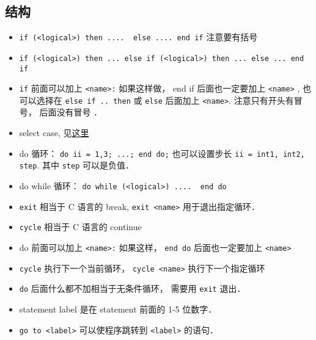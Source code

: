 \subsection{结构}
\begin{itemize}
\item \verb`if (<logical>) then ....  else .... end if` 注意要有括号
\item \verb`if (<logical>) then ... else if (<logical>) then ... else ... end if`
\item \verb`if` 前面可以加上 \verb`<name>:` 如果这样做，  end if 后面也一定要加上 \verb`<name>`  , 也可以选择在 \verb`else if .. then` 或 \verb`else` 后面加上 \verb`<name>`. 注意只有开头有冒号， 后面没有冒号 ．
\item select case, 见\href{http://www.tutorialspoint.com/fortran/select_case_construct.htm}{这里}
\item do 循环：   \verb`do ii = 1,3; ...; end do;` 也可以设置步长 \verb`ii = int1, int2, step`. 其中 \verb`step` 可以是负值．
\item do while 循环： \verb`do while (<logical>) ....  end do`
\item \verb`exit` 相当于 C 语言的 break, \verb`exit <name>` 用于退出指定循环．
\item \verb`cycle` 相当于 C 语言的 continue
\item do 前面可以加上 \verb`<name>:` 如果这样， \verb`end do` 后面也一定要加上 \verb`<name>`
\item \verb`cycle` 执行下一个当前循环， \verb`cycle <name>` 执行下一个指定循环
\item \verb`do` 后面什么都不加相当于无条件循环， 需要用 \verb`exit` 退出．
\item statement label 是在 statement 前面的 1-5 位数字．
\item \verb`go to <label>` 可以使程序跳转到 \verb`<label>` 的语句．
\end{itemize}

